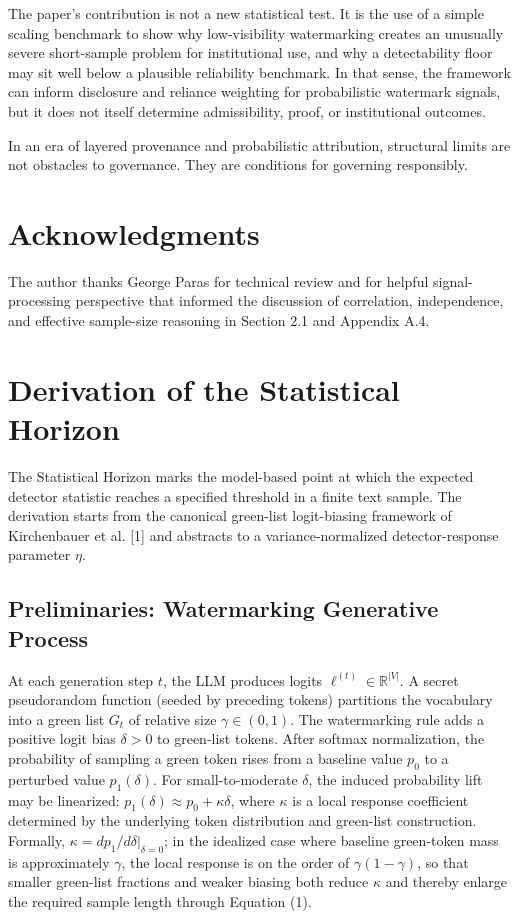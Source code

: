 \documentclass[11pt]{article}
\begin{document}
The paper's contribution is not a new statistical test. It is the use of a simple
scaling benchmark to show why low-visibility watermarking creates an unusually severe
short-sample problem for institutional use, and why a detectability floor may sit well
below a plausible reliability benchmark. In that sense, the framework can inform
disclosure and reliance weighting for probabilistic watermark signals, but it does not
itself determine admissibility, proof, or institutional outcomes.

In an era of layered provenance and probabilistic attribution, structural limits are
not obstacles to governance. They are conditions for governing responsibly.

\section*{Acknowledgments}

The author thanks George Paras for technical review and for helpful signal-processing
perspective that informed the discussion of correlation, independence, and effective
sample-size reasoning in Section 2.1 and Appendix A.4.

\appendix

\section{Derivation of the Statistical Horizon}

The Statistical Horizon marks the model-based point at which the expected detector
statistic reaches a specified threshold in a finite text sample. The derivation
starts from the canonical green-list logit-biasing framework of Kirchenbauer et al.
[1] and abstracts to a variance-normalized detector-response parameter $\eta$.

\subsection{Preliminaries: Watermarking Generative Process}

At each generation step $t$, the LLM produces logits $\ell^{(t)} \in
\mathbb{R}^{|V|}$. A secret pseudorandom function (seeded by preceding tokens)
partitions the vocabulary into a green list $G_t$ of relative size $\gamma \in
(0,1)$. The watermarking rule adds a positive logit bias $\delta > 0$ to green-list
tokens. After softmax normalization, the probability of sampling a green token rises
from a baseline value $p_0$ to a perturbed value $p_1(\delta)$. For
small-to-moderate $\delta$, the induced probability lift may be linearized:
$p_1(\delta) \approx p_0 + \kappa\delta$, where $\kappa$ is a local response
coefficient determined by the underlying token distribution and green-list
construction. Formally, $\kappa = dp_1/d\delta|_{\delta=0}$; in the idealized case
where baseline green-token mass is approximately $\gamma$, the local response is on
the order of $\gamma(1-\gamma)$, so that smaller green-list fractions and weaker
biasing both reduce $\kappa$ and thereby enlarge the required sample length through
Equation (1).
\end{document}

